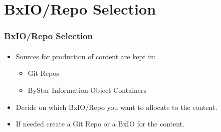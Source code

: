 \section{BxIO/Repo Selection}

\begin{comment}
*****  [[elisp:(org-cycle)][| ]]  [[elisp:(blee:ppmm:org-mode-toggle)][Nat]] [[elisp:(beginning-of-buffer)][Top]] [[elisp:(delete-other-windows)][(1)]] || /Frame/ *Label=BxIO/RepoSelection*  BxIO/Repo Selection ::  [[elisp:(org-cycle)][| ]]
\end{comment}

\begin{frame}[fragile,label=BxIO_2FRepoSelection]
    \frametitle{BxIO/Repo Selection}
    \framesubtitle{}

\begin{itemize}
\item Sources for production of content are kept in:
  \begin{itemize}
  \item Git Repos
  \item ByStar Information Object Containers
  \end{itemize}
\item Decide on which BxIO/Repo you want to allocate to the content.
\item If needed create a Git Repo or a BxIO for the content.
\end{itemize}

\end{frame}


\begin{comment}
*  [[elisp:(org-cycle)][| ]] [[elisp:(org-show-subtree)][|=]] [[elisp:(show-children 10)][|V]] [[elisp:(bx:orgm:indirectBufOther)][|>]] [[elisp:(bx:orgm:indirectBufMain)][|I]] [[elisp:(blee:ppmm:org-mode-toggle)][|N]] [[elisp:(org-top-overview)][|O]] [[elisp:(progn (org-shifttab) (org-content))][|C]] [[elisp:(delete-other-windows)][|1]]  /Section/   Content Base Creation ::  [[elisp:(org-cycle)][| ]]
\end{comment}


